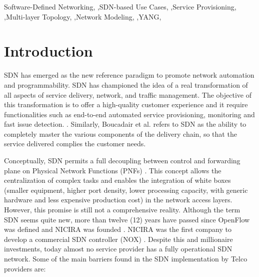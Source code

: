 \documentclass[a4paper,fleqn]{cas-dc}
\begin{document}


\begin{keywords}
Software-Defined Networking,
\sep SDN-based Use Cases, 
\sep Service Provisioning,
\sep Multi-layer Topology,
\sep Network Modeling, 
\sep YANG,  
\end{keywords}

\maketitle

\section{Introduction}
SDN has emerged as the new reference paradigm to promote network automation and programmability. SDN has championed the idea of a real transformation of all aspects of service delivery, network, and traffic management. The objective of this transformation is to offer a high-quality customer experience and it require functionalities such as end-to-end automated service provisioning, monitoring and fast issue detection. \cite{ordonez2017network,ong2017onf}. Similarly, Boucadair et al. \cite{boucadair2014software} refers to SDN as the ability to completely master the various components of the delivery chain, so that the service delivered complies the customer needs.

Conceptually, SDN permits a full decoupling between control and forwarding plane on Physical Network Functions (PNFs) \cite{brief2014openflow}. This concept allows the centralization of complex tasks and enables the integration of white boxes (smaller equipment, higher port density, lower processing capacity, with generic hardware and less expensive production cost) in the network access layers. However, this promise is still not a comprehensive reality. Although the term SDN seems quite new, more than twelve (12) years have passed since OpenFlow was defined and NICIRA was founded \cite{brief2014openflow}. NICIRA was the first company to develop a commercial SDN controller (NOX) \cite{gude2008nox,tavakoli2009applying}. Despite this and millionaire investments, today almost no service provider has a fully operational SDN network. Some of the main barriers found in the SDN implementation by Telco providers are:
\end{document}
